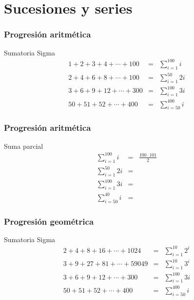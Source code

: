 \documentclass[12pt,spanish,x11names]{beamer}
\title{\talktitle}
\subtitle{\talksubtitle}
\author{\talkauthor}
\institute{\talkaffiliation}
\date{\footnotesize{\emph{\href{\talkblog}{\talkemail}}}}
\begin{document}
\begin{frame}
\titlepage
\end{frame}
\section{Sucesiones y series}
\begin{frame}
  \frametitle{Progresión aritmética}
  \begin{block}{Sumatoria Sigma}
    \begin{eqnarray}
      1+2+3+4+\cdots+100&=&\sum_{i=1}^{100}i\\
      2+4+6+8+\cdots+100&=&\sum_{i=1}^{50}2i\\
      3+6+9+12+\cdots+300&=&\sum_{i=1}^{100}3i\\
      50+51+52+\cdots+400&=&\sum_{i=50}^{400}i
    \end{eqnarray}
  \end{block}
\end{frame}
\begin{frame}
  \setcounter{equation}{0}
  \frametitle{Progresión aritmética}
  \begin{block}{Suma parcial}
    \begin{eqnarray}
      \sum_{i=1}^{100}i&=&\frac{100\cdot 101}{2}\\
      \sum_{i=1}^{50}2i&=&\\
      \sum_{i=1}^{100}3i&=&\\
      \sum_{i=50}^{40}i&=&
    \end{eqnarray}
  \end{block}
\end{frame}
\begin{frame}
  \frametitle{Progresión geométrica}
  \begin{block}{Sumatoria Sigma}
    \begin{eqnarray}
      2+4+8+16+\cdots+1024&=&\sum_{i=1}^{10}2^i\\
      3+9+27+81+\cdots+59049&=&\sum_{i=1}^{10}3^{i}\\
      3+6+9+12+\cdots+300&=&\sum_{i=1}^{100}3i\\
      50+51+52+\cdots+400&=&\sum_{i=50}^{400}i
    \end{eqnarray}
  \end{block}
\end{frame}
\end{document}
